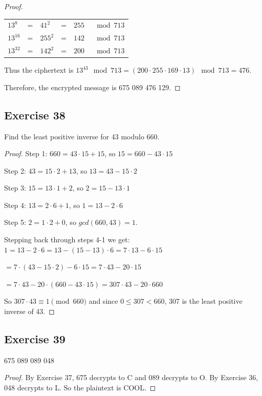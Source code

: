 \documentclass[14pt]{extarticle}
\newcommand{\cy}{\color{cyan}}
\begin{document}
\begin{proof}
        \begin{tabular}{lclcll}
                \(13^8\)    & = & \(41^2\)  & = & \(255\) & \(\mod 713\) \\
                \(13^{16}\) & = & \(255^2\) & = & \(142\) & \(\mod 713\) \\
                \(13^{32}\) & = & \(142^2\) & = & \(200\) & \(\mod 713\)
        \end{tabular}

        Thus the ciphertext is \(13^{43} \mod 713 = (200 \cdot 255 \cdot 169 \cdot 13) \mod 713 = 476\).

        Therefore, the encrypted message is 675 089 476 129.
\end{proof}

\subsection{Exercise 38}
Find the least positive inverse for 43 modulo 660.

\begin{proof}
        {\cy Step 1:} \(660 = 43 \cdot 15 + 15\), so \(15 = 660 - 43 \cdot 15\)

        {\cy Step 2:} \(43 = 15 \cdot 2 + 13\), so \(13 = 43 - 15 \cdot 2\)

        {\cy Step 3:} \(15 = 13 \cdot 1 + 2\), so \(2 = 15 - 13 \cdot 1\)

        {\cy Step 4:} \(13 = 2 \cdot 6 + 1\), so \(1 = 13 - 2 \cdot 6\)

        {\cy Step 5:} \(2 = 1 \cdot 2 + 0\), so \(gcd(660, 43) = 1\).

        Stepping back through steps 4-1 we get: \(1 = 13 - 2 \cdot 6 = 13 - (15 - 13) \cdot 6 = 7 \cdot 13 - 6 \cdot 15\)

        \(= 7 \cdot (43 - 15 \cdot 2) - 6 \cdot 15 = 7 \cdot 43 - 20 \cdot 15\)

        \(= 7 \cdot 43 - 20 \cdot (660 - 43 \cdot 15) = 307 \cdot 43 - 20 \cdot 660\)

        So \(307 \cdot 43 \equiv 1 \pmod{660}\) and since \(0 \leq 307 < 660\), 307 is the least positive inverse of 43.
\end{proof}

\subsection{Exercise 39}
675 089 089 048

\begin{proof}
        By Exercise 37, 675 decrypts to C and 089 decrypts to O. By Exercise 36, 048 decrypts to L. So the plaintext is COOL.
\end{proof}
\end{document}
